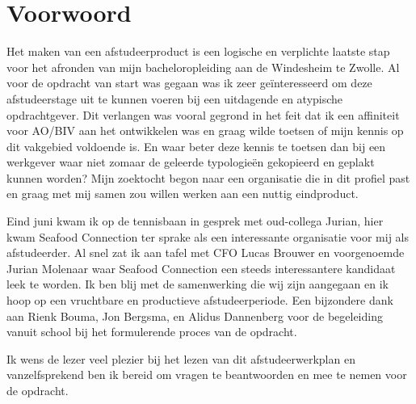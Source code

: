 \documentclass[10pt,a4paper,oneside]{report}
\begin{document}
\chapter*{Voorwoord}
\thispagestyle{empty}
\BgThispage
Het maken van een afstudeerproduct is een logische en verplichte laatste stap voor het afronden van mijn bacheloropleiding aan de Windesheim te Zwolle. Al voor de opdracht van start was gegaan was ik zeer geïnteresseerd om deze afstudeerstage uit te kunnen voeren bij een uitdagende en atypische opdrachtgever. Dit verlangen was vooral gegrond in het feit dat ik een affiniteit voor AO/BIV aan het ontwikkelen was en graag wilde toetsen of mijn kennis op dit vakgebied voldoende is. En waar beter deze kennis te toetsen dan bij een werkgever waar niet zomaar de geleerde typologieën gekopieerd en geplakt kunnen worden?
Mijn zoektocht begon naar een organisatie die in dit profiel past en graag met mij samen zou willen werken aan een nuttig eindproduct.

Eind juni kwam ik op de tennisbaan in gesprek met oud-collega Jurian, hier kwam Seafood Connection ter sprake als een interessante organisatie voor mij als afstudeerder. Al snel zat ik aan tafel met CFO Lucas Brouwer en voorgenoemde Jurian Molenaar waar Seafood Connection een steeds interessantere kandidaat leek te worden. Ik ben blij met de samenwerking die wij zijn aangegaan en ik hoop op een vruchtbare en productieve afstudeerperiode. Een bijzondere dank aan Rienk Bouma, Jon Bergsma, en Alidus Dannenberg voor de begeleiding vanuit school bij het formulerende proces van de opdracht. 

Ik wens de lezer veel plezier bij het lezen van dit afstudeerwerkplan en vanzelfsprekend ben ik bereid om vragen te beantwoorden en mee te nemen voor de opdracht.
\end{document}

